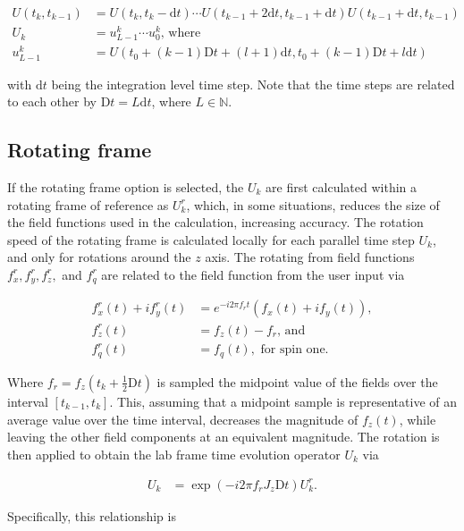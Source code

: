 \documentclass{jors}
\begin{document}
		\begin{align}
			U(t_k, t_{k-1}) &= U(t_k, t_k - \mathrm{d}t) \cdots U(t_{k-1} + 2\mathrm{d}t, t_{k-1} + \mathrm{d}t) U(t_{k-1} + \mathrm{d}t, t_{k-1})\\
			U_k &= u^k_{L-1} \cdots u^k_0\textrm{, where}\\
			u^k_{L-1} &= U(t_0 + (k - 1)\mathrm{D}t + (l + 1)\mathrm{d}t, t_0 + (k - 1)\mathrm{D}t + l\mathrm{d}t)
		\end{align}

		with \(\mathrm{d}t\) being the integration level time step. Note that the time steps are related to each other by \(\mathrm{D}t = L\mathrm{d}t\), where \(L\in\mathbb{N}\).

	\subsection{Rotating frame}
		If the rotating frame option is selected, the \(U_k\) are first calculated within a rotating frame of reference as \(U^r_k\), which, in some situations, reduces the size of the field functions used in the calculation, increasing accuracy. The rotation speed of the rotating frame is calculated locally for each parallel time step \(U_k\), and only for rotations around the \(z\) axis. The rotating from field functions \(f^r_x, f^r_y, f^r_z,\) and \(f^r_q\) are related to the field function from the user input via
		
		\begin{align}
			f^r_x(t) + if^r_y(t) &= e^{-i 2\pi f_r t}(f_x(t) + if_y(t)),\\
			f^r_z(t) &= f_z(t) - f_r\textrm{, and}\\
			f^r_q(t) &= f_q(t), \textrm{ for spin one.}
		\end{align}
		
		Where \(f_r = f_z(t_k + \frac12\mathrm{D}t)\) is sampled the midpoint value of the fields over the interval \([t_{k - 1}, t_k]\). This, assuming that a midpoint sample is representative of an average value over the time interval, decreases the magnitude of \(f_z(t)\), while leaving the other field components at an equivalent magnitude. The rotation is then applied to obtain the lab frame time evolution operator \(U_k\) via
		
		\begin{align}
			U_k &= \exp(-i 2 \pi f_r J_z \mathrm{D}t) U^r_k.
		\end{align}

		Specifically, this relationship is
\end{document}
